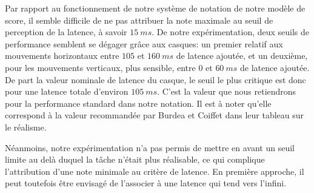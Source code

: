 	\par Par rapport au fonctionnement de notre système de notation de notre modèle de score, il semble difficile de ne pas attribuer la note maximale au seuil de perception de la latence, à savoir $15~ms$. De notre expérimentation, deux seuils de performance semblent se dégager grâce aux casques: un premier relatif aux mouvements horizontaux entre $105$ et $160~ms$ de latence ajoutée, et un deuxième, pour les mouvements verticaux, plus sensible, entre $0$ et $60~ms$ de latence ajoutée. De part la valeur nominale de latence du casque, le seuil le plus critique est donc pour une latence totale d'environ $105~ms$. C'est la valeur que nous retiendrons pour la performance standard dans notre notation. Il est à noter qu'elle correspond à la valeur recommandée par Burdea et Coiffet dans leur tableau sur le réalisme.
	
	\par Néanmoins, notre expérimentation n'a pas permis de mettre en avant un seuil limite au delà duquel la tâche n'était plus réalisable, ce qui complique l'attribution d'une note minimale au critère de latence. En première approche, il peut toutefois être envisagé de l'associer à une latence qui tend vers l'infini.